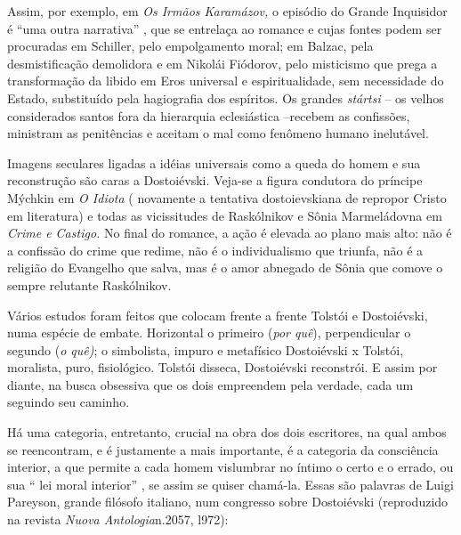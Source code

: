 Assim, por exemplo, em \emph{Os Irmãos Karamázov,} o episódio do Grande
Inquisidor é ``uma outra narrativa'' , que se entrelaça ao romance e
cujas fontes podem ser procuradas em Schiller, pelo empolgamento moral;
em Balzac, pela desmistificação demolidora e em Nikolái Fiódorov, pelo
misticismo que prega a transformação da libido em Eros universal e
espiritualidade, sem necessidade do Estado, substituído pela hagiografia
dos espíritos. Os grandes \emph{stártsi} -- os velhos considerados
santos fora da hierarquia eclesiástica --recebem as confissões,
ministram as penitências e aceitam o mal como fenômeno humano
inelutável.

Imagens seculares ligadas a idéias universais como a queda do homem e
sua reconstrução são caras a Dostoiévski. Veja-se a figura condutora do
príncipe Mýchkin em \emph{O Idiota} ( novamente a tentativa
dostoievskiana de repropor Cristo em literatura) e todas as vicissitudes
de Raskólnikov e Sônia Marmeládovna em \emph{Crime e Castigo.} No final
do romance, a ação é elevada ao plano mais alto: não é a confissão do
crime que redime, não é o individualismo que triunfa, não é a religião
do Evangelho que salva, mas é o amor abnegado de Sônia que comove o
sempre relutante Raskólnikov.

Vários estudos foram feitos que colocam frente a frente Tolstói e
Dostoiévski, numa espécie de embate. Horizontal o primeiro (\emph{por
quê}), perpendicular o segundo (\emph{o quê)}; o simbolista, impuro e
metafísico Dostoiévski x Tolstói, moralista, puro, fisiológico. Tolstói
disseca, Dostoiévski reconstrói. E assim por diante, na busca obsessiva
que os dois empreendem pela verdade, cada um seguindo seu caminho.

Há uma categoria, entretanto, crucial na obra dos dois escritores, na
qual ambos se reencontram, e é justamente a mais importante, é a
categoria da consciência interior, a que permite a cada homem vislumbrar
no íntimo o certo e o errado, ou sua `` lei moral interior'' , se assim
se quiser chamá-la. Essas são palavras de Luigi Pareyson, grande
filósofo italiano, num congresso sobre Dostoiévski (reproduzido na
revista \emph{Nuova Antologia}n.2057, l972):

